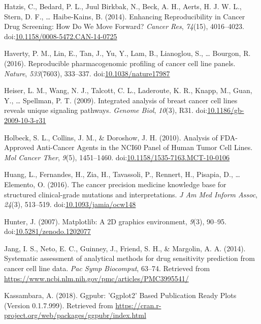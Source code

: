 \documentclass[man]{apa6}
\begin{document}
\hypertarget{ref-hatzis2014}{}
Hatzis, C., Bedard, P. L., Juul Birkbak, N., Beck, A. H., Aerts, H. J.
W. L., Stern, D. F., \ldots{} Haibe-Kains, B. (2014). Enhancing
Reproducibility in Cancer Drug Screening: How Do We Move Forward?
\emph{Cancer Res}, \emph{74}(15), 4016--4023.
doi:\href{https://doi.org/10.1158/0008-5472.CAN-14-0725}{10.1158/0008-5472.CAN-14-0725}

\hypertarget{ref-haverty2016}{}
Haverty, P. M., Lin, E., Tan, J., Yu, Y., Lam, B., Lianoglou, S.,
\ldots{} Bourgon, R. (2016). Reproducible pharmacogenomic profiling of
cancer cell line panels. \emph{Nature}, \emph{533}(7603), 333--337.
doi:\href{https://doi.org/10.1038/nature17987}{10.1038/nature17987}

\hypertarget{ref-heiser2009}{}
Heiser, L. M., Wang, N. J., Talcott, C. L., Laderoute, K. R., Knapp, M.,
Guan, Y., \ldots{} Spellman, P. T. (2009). Integrated analysis of breast
cancer cell lines reveals unique signaling pathways. \emph{Genome Biol},
\emph{10}(3), R31.
doi:\href{https://doi.org/10.1186/gb-2009-10-3-r31}{10.1186/gb-2009-10-3-r31}

\hypertarget{ref-holbeck2010}{}
Holbeck, S. L., Collins, J. M., \& Doroshow, J. H. (2010). Analysis of
FDA-Approved Anti-Cancer Agents in the NCI60 Panel of Human Tumor Cell
Lines. \emph{Mol Cancer Ther}, \emph{9}(5), 1451--1460.
doi:\href{https://doi.org/10.1158/1535-7163.MCT-10-0106}{10.1158/1535-7163.MCT-10-0106}

\hypertarget{ref-huang2016}{}
Huang, L., Fernandes, H., Zia, H., Tavassoli, P., Rennert, H., Pisapia,
D., \ldots{} Elemento, O. (2016). The cancer precision medicine
knowledge base for structured clinical-grade mutations and
interpretations. \emph{J Am Med Inform Assoc}, \emph{24}(3), 513--519.
doi:\href{https://doi.org/10.1093/jamia/ocw148}{10.1093/jamia/ocw148}

\hypertarget{ref-hunter2007}{}
Hunter, J. (2007). Matplotlib: A 2D graphics environment, \emph{9}(3),
90--95.
doi:\href{https://doi.org/10.5281/zenodo.1202077}{10.5281/zenodo.1202077}

\hypertarget{ref-jang2014}{}
Jang, I. S., Neto, E. C., Guinney, J., Friend, S. H., \& Margolin, A. A.
(2014). Systematic assessment of analytical methods for drug sensitivity
prediction from cancer cell line data. \emph{Pac Symp Biocomput},
63--74. Retrieved from
\url{https://www.ncbi.nlm.nih.gov/pmc/articles/PMC3995541/}

\hypertarget{ref-kassambara2018}{}
Kassambara, A. (2018). Ggpubr: 'Ggplot2' Based Publication Ready Plots
(Version 0.1.7.999). Retrieved from
\url{https://cran.r-project.org/web/packages/ggpubr/index.html}
\end{document}
